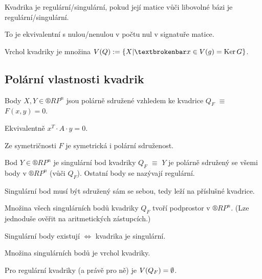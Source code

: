 \documentclass[12pt]{article}					%
\begin{document}
\begin{definice}
	Kvadrika je regulární/singulární, pokud její matice vůči libovolné bázi je regulární/singulární.

	\begin{poznamkain}
		To je ekvivalentní s nulou/nenulou v počtu nul v signatuře matice.
	\end{poznamkain}
\end{definice}

\begin{definice}
	Vrchol kvadriky je množina $V(Q) := \{X | ¦x \in V(g) = \Ker G\}$.
\end{definice}


\subsection{Polární vlastnosti kvadrik}
\begin{definice}
	Body $X, Y \in ®RP^n$ jsou polárně sdružené vzhledem ke kvadrice $Q_F$ $≡$ $F(x, y) = 0$.

	\begin{poznamkain}
		Ekvivalentně $x^T·A·y = 0$.

		Ze symetričnosti $F$ je symetrická i polární sdruženost.
	\end{poznamkain}
\end{definice}

\begin{definice}
	Bod $Y \in ®RP^n$ je singulární bod kvadriky $Q_F$ $≡$ $Y$ je polárně sdružený se všemi body v $®RP^n$ (vůči $Q_F$). Ostatní body se nazývají regulární.

	\begin{poznamkain}
		Singulární bod musí být sdružený sám se sebou, tedy leží na příslušné kvadrice.

		Množina všech singulárních bodů kvadriky $Q_F$ tvoří podprostor v $®RP^n$. (Lze jednoduše ověřit na aritmetických zástupcích.)

		Singulární body existují $\Leftrightarrow$ kvadrika je singulární.

		Množina singulárních bodů je vrchol kvadriky.
	\end{poznamkain}
	
	\begin{dusledekin}
		Pro regulární kvadriky (a právě pro ně) je $V(Q_F) = \emptyset$.
	\end{dusledekin}
\end{definice}
\end{document}
